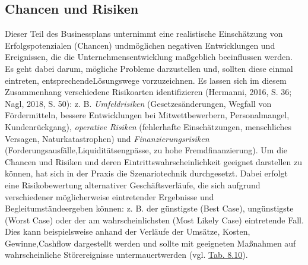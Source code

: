 \documentclass[
  letterpaper,
]{book}
\begin{document}
\subsection{Chancen und Risiken}\label{chancen-und-risiken}

Dieser Teil des Businessplans unternimmt eine realistische Einschätzung
von Erfolgspotenzialen (Chancen) undmöglichen negativen Entwicklungen
und Ereignissen, die die Unternehmensentwicklung maßgeblich beeinflussen
werden. Es geht dabei darum, mögliche Probleme darzustellen und, sollten
diese einmal eintreten, entsprechendeLösungswege vorzuzeichnen. Es
lassen sich im diesem Zusammenhang verschiedene Risikoarten
identifizieren (Hermanni, 2016, S. 36; Nagl, 2018, S. 50): z. B.
\emph{Umfeldrisiken }(Gesetzesänderungen, Wegfall von Fördermitteln,
bessere Entwicklungen bei Mitwettbewerbern, Personalmangel,
Kundenrückgang), \emph{operative Risiken }(fehlerhafte Einschätzungen,
menschliches Versagen, Naturkatastrophen) und \emph{Finanzierungsrisiken
}(Forderungsausfälle,Liquiditätsengpässe, zu hohe Fremdfinanzierung). Um
die Chancen und Risiken und deren Eintrittswahrscheinlichkeit geeignet
darstellen zu können, hat sich in der Praxis die Szenariotechnik
durchgesetzt. Dabei erfolgt eine Risikobewertung alternativer
Geschäftsverläufe, die sich aufgrund verschiedener möglicherweise
eintretender Ergebnisse und Begleitumständeergeben können: z. B. der
günstigste (Best Case), ungünstigste (Worst Case) oder der am
wahrscheinlichsten (Most Likely Case) eintretende Fall. Dies kann
beispielsweise anhand der Verläufe der Umsätze, Kosten, Gewinne,Cashflow
dargestellt werden und sollte mit geeigneten Maßnahmen auf
wahrscheinliche Störereignisse untermauertwerden (vgl.
\hyperref[table810]{Tab. 8.10}).
\end{document}
